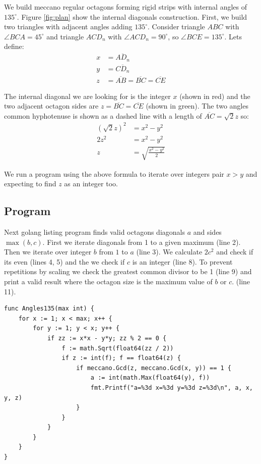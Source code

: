\documentclass[11pt]{article}
\begin{document}
We build meccano regular octagons forming rigid strips with internal angles of $135^\circ{}$. 
Figure \ref{fig:plan} show the internal diagonals construction. First, we build two
triangles with adjacent angles adding $135^\circ{}$. Consider triangle $ABC$ with
$\angle{BCA} = 45^\circ{}$ and triangle $ACD_n$ with $\angle{ACD_n} = 90^\circ{}$,
so $\angle{BCE} = 135^\circ{}$. Lets define:
\begin{align*}
x &= \overline{AD_n}\\
y &= \overline{CD_n}\\
z &= \overline{AB} = \overline{BC} = \overline{CE}
\end{align*}

The internal diagonal we are looking for is the integer $x$ (shown in red) and the two
adjacent octagon sides are $z = \overline{BC} = \overline{CE}$ (shown in green).
The two angles common hyphotenuse is shown as a dashed line with a length of $\overline{AC} = \sqrt{2}z$ so:
\begin{align*}
(\sqrt{2}z)^2 &= x^2 - y^2\\
         2z^2 &= x^2 - y^2\\
            z &= \sqrt{\frac{x^2 - y^2}{2}}
\end{align*}

We run a program using the above formula to iterate over integers pair $x > y$ and 
expecting to find $z$ as an integer too.

\subsection{Program}
Next golang listing program finds valid octagons diagonals $a$ and sides $\max(b,c)$.
First we iterate diagonals from 1 to a given maximum (line 2).
Then we iterate over integer $b$ from $1$ to $a$ (line 3).
We calculate $2c^2$ and check if its even (lines 4, 5) and the we check
if $c$ is an integer (line 8). To prevent repetitions by scaling we check
the greatest common divisor to be 1 (line 9) and print a valid result 
where the octagon size is the maximum value of $b$ or $c$. (line 11).
\begin{lstlisting}
func Angles135(max int) {
	for x := 1; x < max; x++ {
		for y := 1; y < x; y++ {
			if zz := x*x - y*y; zz % 2 == 0 {
				f := math.Sqrt(float64(zz / 2))
				if z := int(f); f == float64(z) {
					if meccano.Gcd(z, meccano.Gcd(x, y)) == 1 {
						a := int(math.Max(float64(y), f))
						fmt.Printf("a=%3d x=%3d y=%3d z=%3d\n", a, x, y, z)
					}
				}
			}
		}
	}
}
\end{lstlisting}
\end{document}
